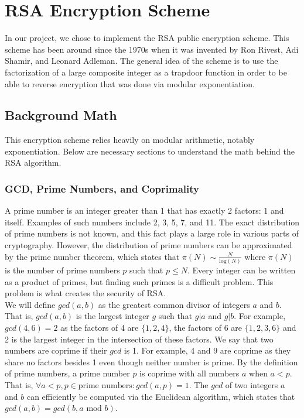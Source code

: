 \section{RSA Encryption Scheme}\label{sec:rsa}

	In our project, we chose to implement the RSA public encryption scheme. This scheme has been around since the 1970s when it was invented by Ron Rivest, Adi Shamir, and Leonard Adleman.
	The general idea of the scheme is to use the factorization of a large composite integer as a trapdoor function in order to be able to reverse encryption that was done via modular
	exponentiation.

	\subsection{Background Math}\label{sec:rsa-background}
		This encryption scheme relies heavily on modular arithmetic, notably exponentiation. Below are necessary sections to understand the math behind the RSA algorithm.

		\subsubsection{GCD, Prime Numbers, and Coprimality}\label{sec:rsa-gcd}
			A prime number is an integer greater than 1 that has exactly 2 factors: 1 and itself. Examples of such numbers include 2, 3, 5, 7, and 11. The exact distribution of prime numbers
			is not known, and this fact plays a large role in various parts of cryptography. However, the distribution of prime numbers can be approximated by the prime number theorem, which
			states that $\pi(N)\sim\frac{N}{\text{log}(N)}$ where $\pi(N)$ is the number of prime numbers $p$ such that $p\leq N$. Every integer can be written as a product of primes, but
			finding such primes is a difficult problem. This problem is what creates the security of RSA.\\

			We will define $gcd(a, b)$ as the greatest common divisor of integers $a$ and $b$. That is, $gcd(a, b)$ is the largest integer $g$ such that $g|a$ and $g|b$. For example, 
			$gcd(4,6)=2$ as the factors of 4 are $\{1,2,4\}$, the factors of 6 are $\{1,2,3,6\}$ and 2 is the largest integer in the intersection of these factors. We say that two numbers
			are coprime if their $gcd$ is 1. For example, 4 and 9 are coprime as they share no factors besides 1 even though neither number is prime. By the definition of prime numbers, a
			prime number $p$ is coprime with all numbers $a$ when $a<p$. That is, $\forall a<p, p\in\text{prime numbers}:gcd(a, p)=1$. The $gcd$ of two integers $a$ and $b$ can efficiently
			be computed via the Euclidean algorithm, which states that $gcd(a,b)=gcd(b,a\text{ mod }b)$.

